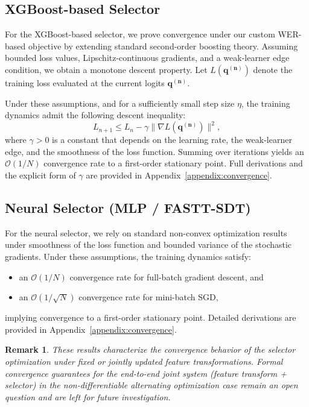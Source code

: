 \documentclass[journal]{IEEEtran}
\newtheorem{remark}{Remark}
\begin{document}
    \vspace{-0.30em}
    
    \subsection{XGBoost-based Selector}
    
    For the XGBoost-based selector, we prove convergence under our custom WER-based objective by extending standard second-order boosting theory. Assuming bounded loss values, Lipschitz-continuous gradients, and a weak-learner edge condition, we obtain a monotone descent property. Let \(L(\mathbf{q^{(n)}})\) denote the training loss evaluated at the current logits \(\mathbf{q^{(n)}}\). 
    
    Under these assumptions, and for a sufficiently small step size \(\eta\), the training dynamics admit the following descent inequality:
    \begin{equation}
        L_{n+1} \leq L_n - \gamma \| \nabla L(\mathbf{q^{(n)}}) \|^2,
    \end{equation}
    where \(\gamma > 0\) is a constant that depends on the learning rate, the weak-learner edge, and the smoothness of the loss function. Summing over iterations yields an \(\mathcal{O}(1/N)\) convergence rate to a first-order stationary point. Full derivations and the explicit form of \(\gamma\) are provided in Appendix~\ref{appendix:convergence}.
    
    
    \subsection{Neural Selector (MLP / FASTT-SDT)}
    
    For the neural selector, we rely on standard non-convex optimization results under smoothness of the loss function and bounded variance of the stochastic gradients. Under these assumptions, the training dynamics satisfy:
    \begin{itemize}
        \item an $\mathcal{O}(1/N)$ convergence rate for full-batch gradient descent, and
        \item an $\mathcal{O}(1/\sqrt{N})$ convergence rate for mini-batch SGD,
    \end{itemize}
    implying convergence to a first-order stationary point. Detailed derivations are provided in Appendix~\ref{appendix:convergence}.

        \begin{remark}
        These results characterize the convergence behavior of the \emph{selector
        optimization} under fixed or jointly updated feature transformations. Formal
        convergence guarantees for the end-to-end joint system (feature
        transform + selector) in the non-differentiable alternating optimization
        case remain an open question and are left for future investigation.
    \end{remark}
\end{document}
